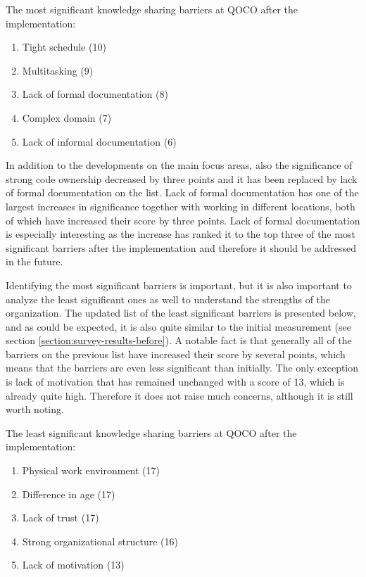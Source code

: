 \begin{center}
	The most significant knowledge sharing barriers at QOCO after the implementation:
	
	\begin{enumerate}
		\centering
		\item Tight schedule (10)
		\item Multitasking (9)
		\item Lack of formal documentation (8)
		\item Complex domain (7)
		\item Lack of informal documentation (6)
	\end{enumerate}
\end{center}

In addition to the developments on the main focus areas, also the significance of strong code ownership decreased by three points and it has been replaced by lack of formal documentation on the list.
Lack of formal documentation has one of the largest increases in significance together with working in different locations, both of which have increased their score by three points. Lack of formal documentation
is especially interesting as the increase has ranked it to the top three of the most significant barriers after the implementation and therefore it should be addressed in the future.

\vspace{12pt}

Identifying the most significant barriers is important, but it is also important to analyze the least significant ones as well
to understand the strengths of the organization. The updated list of the least significant barriers
is presented below, and as could be expected, it is also quite similar to the initial measurement (see section \ref{section:survey-results-before}). A notable fact is that generally all of the barriers on
the previous list have increased their score by several points, which means that the barriers are even less significant than initially. The only exception is lack of motivation that has remained
unchanged with a score of 13, which is already quite high. Therefore it does not raise much concerns, although it is still worth noting.

\begin{center}
	The least significant knowledge sharing barriers at QOCO after the implementation:
	
	\begin{enumerate}
		\centering
		\item Physical work environment (17)
		\item Difference in age (17)
		\item Lack of trust (17)
		\item Strong organizational structure (16)
		\item Lack of motivation (13)
	\end{enumerate}
\end{center}

